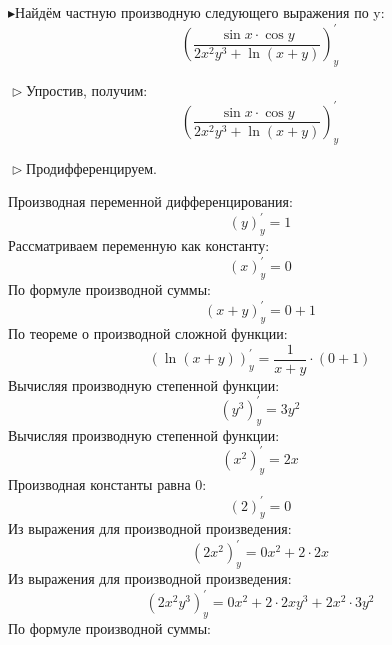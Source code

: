 \documentclass[12pt]{article}
\begin{document}
$\blacktriangleright$Найдём частную производную следующего выражения по y:
                             \begin{dmath*}
                             \left( \frac {\sin x \cdot \cos y} {2x^{2}y^{3} + \ln\left(x + y\right)} \right)_{y}^{\prime}
                             \end{dmath*}

$\vartriangleright$Упростив, получим: 
                             \begin{dmath*}
                             \left( \frac {\sin x \cdot \cos y} {2x^{2}y^{3} + \ln\left(x + y\right)} \right)_{y}^{\prime}
                             \end{dmath*}

$\vartriangleright$Продифференцируем.

Производная переменной дифференцирования:
\begin{dmath*}
\left(y\right)_{y}^{\prime} = 1
\end{dmath*}Рассматриваем переменную как константу:
\begin{dmath*}
\left(x\right)_{y}^{\prime} = 0
\end{dmath*}По формуле производной суммы:
\begin{dmath*}
\left(x + y\right)_{y}^{\prime} = 0 + 1
\end{dmath*}По теореме о производной сложной функции:
\begin{dmath*}
\left(\ln\left(x + y\right)\right)_{y}^{\prime} =  \frac {1} {x + y}  \cdot \left(0 + 1\right)
\end{dmath*}Вычисляя производную степенной функции:
\begin{dmath*}
\left(y^{3}\right)_{y}^{\prime} = 3y^{2}
\end{dmath*}Вычисляя производную степенной функции:
\begin{dmath*}
\left(x^{2}\right)_{y}^{\prime} = 2x
\end{dmath*}Производная константы равна 0:
\begin{dmath*}
\left(2\right)_{y}^{\prime} = 0
\end{dmath*}Из выражения для производной произведения:
\begin{dmath*}
\left(2x^{2}\right)_{y}^{\prime} = 0x^{2} + 2 \cdot 2x
\end{dmath*}Из выражения для производной произведения:
\begin{dmath*}
\left(2x^{2}y^{3}\right)_{y}^{\prime} = 0x^{2} + 2 \cdot 2xy^{3} + 2x^{2} \cdot 3y^{2}
\end{dmath*}По формуле производной суммы:
\end{document}

